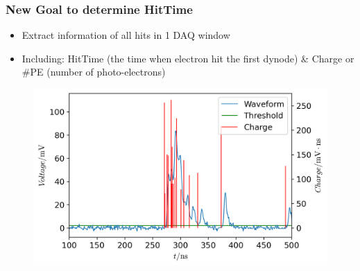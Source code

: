 \documentclass{beamer}
\begin{document}
\begin{frame}
\frametitle{New Goal to determine HitTime}
\begin{itemize}
    \item Extract information of all hits in 1 DAQ window
    \item Including: HitTime (the time when electron hit the first dynode) \& Charge or \#PE (number of photo-electrons)
\end{itemize}
\begin{figure}
    \centering
    \includegraphics[width=0.8\linewidth]{img/goal.png}
\end{figure}
\end{frame}
\end{document}

